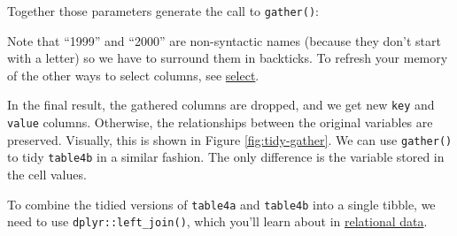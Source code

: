 \documentclass[]{book}
\newenvironment{Shaded}{\begin{snugshade}}{\end{snugshade}}
\newcommand{\CommentTok}[1]{\textcolor[rgb]{0.56,0.35,0.01}{\textit{#1}}}
\newcommand{\DataTypeTok}[1]{\textcolor[rgb]{0.13,0.29,0.53}{#1}}
\newcommand{\KeywordTok}[1]{\textcolor[rgb]{0.13,0.29,0.53}{\textbf{#1}}}
\newcommand{\NormalTok}[1]{#1}
\newcommand{\OperatorTok}[1]{\textcolor[rgb]{0.81,0.36,0.00}{\textbf{#1}}}
\newcommand{\StringTok}[1]{\textcolor[rgb]{0.31,0.60,0.02}{#1}}
\theoremstyle{definition}
\theoremstyle{definition}
\theoremstyle{definition}
\theoremstyle{remark}
\let\BeginKnitrBlock\begin \let\EndKnitrBlock\end
\begin{document}
Together those parameters generate the call to \texttt{gather()}:

\begin{Shaded}
\end{Shaded}

\BeginKnitrBlock{rmdimportant}
Note that ``1999'' and ``2000'' are non-syntactic names (because they
don't start with a letter) so we have to surround them in backticks. To
refresh your memory of the other ways to select columns, see
\protect\hyperlink{select}{select}.
\EndKnitrBlock{rmdimportant}

In the final result, the gathered columns are dropped, and we get new
\texttt{key} and \texttt{value} columns. Otherwise, the relationships
between the original variables are preserved. Visually, this is shown in
Figure \ref{fig:tidy-gather}. We can use \texttt{gather()} to tidy
\texttt{table4b} in a similar fashion. The only difference is the
variable stored in the cell values.

To combine the tidied versions of \texttt{table4a} and \texttt{table4b}
into a single tibble, we need to use \texttt{dplyr::left\_join()}, which
you'll learn about in \protect\hyperlink{relational-data}{relational
data}.
\end{document}

